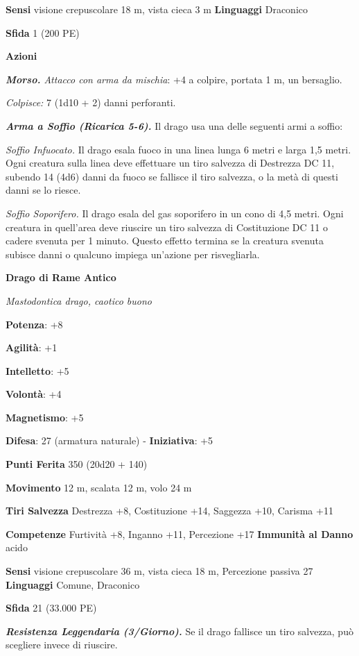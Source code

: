 \begin{multicols}{2}
\textbf{Sensi} visione crepuscolare 18 m, vista cieca 3 m
\textbf{Linguaggi} Draconico

\textbf{Sfida} 1 (200 PE)\smallskip

\smallskip\textbf{Azioni}

\emph{\textbf{Morso.} Attacco con arma da mischia}: +4 a colpire,
portata 1 m, un bersaglio.

\emph{Colpisce:} 7 (1d10 + 2) danni perforanti.

\emph{\textbf{Arma a Soffio (Ricarica 5-6).}} Il drago usa una delle
seguenti armi a soffio:

\emph{Soffio Infuocato.} Il drago esala fuoco in una linea lunga 6 metri
e larga 1,5 metri. Ogni creatura sulla linea deve effettuare un tiro
salvezza di Destrezza DC 11, subendo 14 (4d6) danni da fuoco se fallisce
il tiro salvezza, o la metà di questi danni se lo riesce.

\emph{Soffio Soporifero.} Il drago esala del gas soporifero in un cono
di 4,5 metri. Ogni creatura in quell'area deve riuscire un tiro salvezza
di Costituzione DC 11 o cadere svenuta per 1 minuto. Questo effetto
termina se la creatura svenuta subisce danni o qualcuno impiega
un'azione per risvegliarla.

\textbf{Drago di Rame Antico}

\emph{Mastodontica drago, caotico buono}

\textbf{Potenza}: +8

\textbf{Agilità}: +1

\textbf{Intelletto}: +5

\textbf{Volontà}: +4

\textbf{Magnetismo}: +5

\textbf{Difesa}: 27 (armatura naturale) - \textbf{Iniziativa}: +5

\textbf{Punti Ferita} 350 (20d20 + 140)

\textbf{Movimento} 12 m, scalata 12 m, volo 24 m

\textbf{Tiri Salvezza} Destrezza +8, Costituzione +14, Saggezza +10,
Carisma +11

\textbf{Competenze} Furtività +8, Inganno +11, Percezione +17
\textbf{Immunità al Danno} acido

\textbf{Sensi} visione crepuscolare 36 m, vista cieca 18 m, Percezione passiva
27 \textbf{Linguaggi} Comune, Draconico

\textbf{Sfida} 21 (33.000 PE)\smallskip

\emph{\textbf{Resistenza Leggendaria (3/Giorno).}} Se il drago fallisce
un tiro salvezza, può scegliere invece di riuscire.


\end{multicols}

